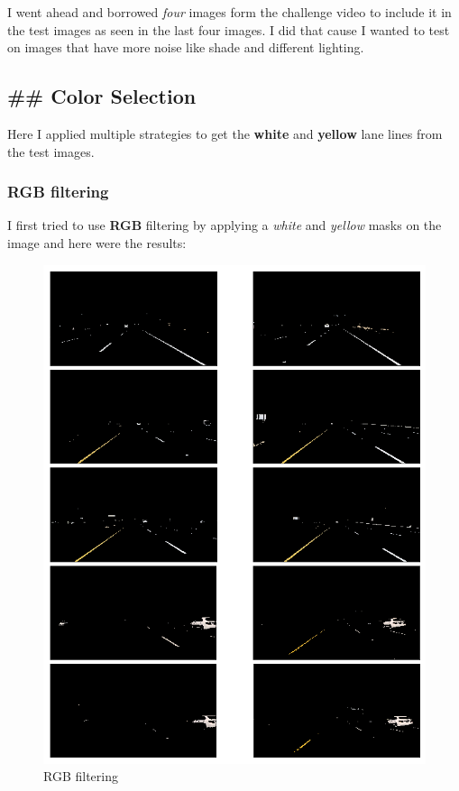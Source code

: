 \documentclass[11pt]{article}
\makeatletter
\def\maxwidth{\ifdim\Gin@nat@width>\linewidth\linewidth
    \else\Gin@nat@width\fi}
\let\Oldincludegraphics\includegraphics
\renewcommand{\includegraphics}[1]{\Oldincludegraphics[width=.8\maxwidth]{#1}}
\makeatother
\begin{document}
I went ahead and borrowed \emph{four} images form the challenge video to
include it in the test images as seen in the last four images. I did
that cause I wanted to test on images that have more noise like shade
and different lighting.

    \hypertarget{color-selection}{%
\subsection{\#\# Color Selection}\label{color-selection}}

Here I applied multiple strategies to get the \textbf{white} and
\textbf{yellow} lane lines from the test images.

\hypertarget{rgb-filtering}{%
\subsubsection{RGB filtering}\label{rgb-filtering}}

I first tried to use \textbf{RGB} filtering by applying a \emph{white}
and \emph{yellow} masks on the image and here were the results:

\begin{figure}
\centering
\includegraphics{test_images_output/rgb_filtered_test_images.png}
\caption{RGB filtering}
\end{figure}
\end{document}
